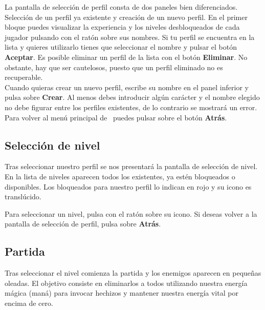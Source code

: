 
La pantalla de selección de perfil consta de dos paneles bien diferenciados.
Selección de un perfil ya existente y creación de un nuevo perfil. En el primer
bloque puedes visualizar la experiencia y los niveles desbloqueados de
cada jugador pulsando con el ratón sobre sus nombres. Si tu
perfil se encuentra en la lista y quieres utilizarlo tienes que seleccionar
el nombre y pulsar el botón \textbf{Aceptar}. Es posible eliminar
un perfil de la lista con el botón \textbf{Eliminar}. No obstante, 
hay que ser cautelosos, puesto que un perfil eliminado no es recuperable.\\

Cuando quieras crear un nuevo perfil, escribe su nombre en el panel
inferior y pulsa sobre \textbf{Crear}. Al menos debes introducir algún
carácter y el nombre elegido no debe figurar entre los perfiles existentes,
de lo contrario se mostrará un error.\\

Para volver al menú principal de \juego\ puedes pulsar sobre el botón
\textbf{Atrás}.


\subsection*{Selección de nivel}
\label{sec:levelselection}

Tras seleccionar nuestro perfil se nos presentará la pantalla de selección
de nivel. En la lista de niveles aparecen todos los existentes, ya estén
bloqueados o disponibles. Los bloqueados para nuestro perfil lo indican
en rojo y su icono es translúcido.\\


Para seleccionar un nivel, pulsa con el ratón sobre su icono. Si deseas
volver a la pantalla de selección de perfil, pulsa sobre \textbf{Atrás}.

\subsection*{Partida}

Tras seleccionar el nivel comienza la partida y los enemigos aparecen
en pequeñas oleadas. El objetivo consiste en eliminarlos a todos utilizando
nuestra energía mágica (maná) para invocar hechizos y mantener nuestra
energía vital por encima de cero.\\

